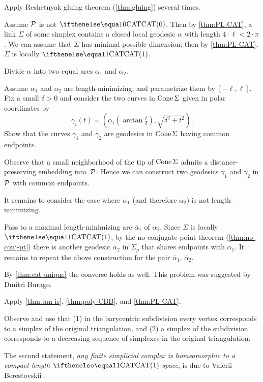Apply Reshetnyak gluing theorem (\ref{thm:gluing}) several times.

Assume $\mathcal{P}$ is not $\CAT0$.
Then by \ref{thm:PL-CAT}, a link $\Sigma$ of some simplex contains a closed local geodesic $\alpha$ with length $4\cdot\ell<2\cdot\pi$.
We can assume that $\Sigma$ has minimal possible dimension;
then by \ref{thm:PL-CAT}, $\Sigma$ is locally $\CAT1$.

Divide $\alpha$ into two equal arcs $\alpha_1$ and $\alpha_2$.

Assume $\alpha_1$ and $\alpha_2$ are length-minimizing, and 
parametrize them by $[-\ell,\ell]$.
Fix a small $\delta>0$ and 
consider the two curves in $\mathop{\rm Cone}\nolimits\Sigma$ given in polar coordinates by 
\[\gamma_i(t)=(\alpha_i(\arctan \tfrac t\delta),\sqrt{\delta^2+t^2}).\]
Show that the curves $\gamma_1$ and $\gamma_2$ are geodesics in $\mathop{\rm Cone}\nolimits\Sigma$ having common endpoints.

Observe that a small neighborhood of the tip of $\mathop{\rm Cone}\nolimits\Sigma$ admits a distance-preserving embedding into~$\mathcal{P}$.
Hence we can construct two geodesics $\gamma_1$ and $\gamma_2$ in $\mathcal{P}$ with common endpoints.

It remains to consider the case where $\alpha_1$ (and therefore $\alpha_2$) is not length-minimizing.

Pass to a maximal length-minimizing arc $\bar\alpha_1$ of $\alpha_1$.
Since $\Sigma$ is locally $\CAT1$, by the no-conjugate-point theorem (\ref{thm:no-conj-pt}) 
there is another geodesic $\bar\alpha_2$ in $\Sigma_p$ that shares endpoints with $\bar\alpha_1$.
It remains to repeat the above construction for the pair $\bar\alpha_1$, $\bar\alpha_2$.

By \ref{thm:cat-unique} the converse holds as well.
This problem was suggested by Dmitri Burago.

 Apply \ref{thm:tan-is}, \ref{thm:poly-CBB}, and \ref{thm:PL-CAT}.

Observe and use that (1) in the barycentric subdivision every vertex corresponds to a simplex of the original triangulation,
and (2) a simplex of the subdivision corresponds to a decreasing sequence of simplexes in the original triangulation. 

The second statement, \textit{any finite  simplicial complex is homeomorphic to a compact length $\CAT1$ space}, is due to Valerii Berestovskii \cite{berestovskii}.

